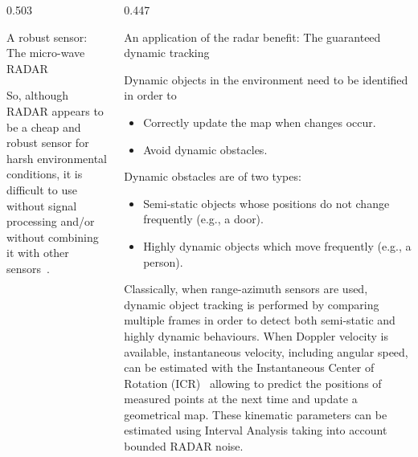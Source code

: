 \documentclass[final]{beamer}
\begin{document}
\begin{frame}[t]{}
\begin{columns}[T]
\begin{column}{0.503\linewidth}
\begin{block}{A robust sensor: The micro-wave RADAR}
    \vspace{2cm}

    So, although RADAR appears to be a cheap and robust sensor for harsh environmental conditions, it is difficult to use without signal processing and/or without combining it with other sensors~\cite{radarsurvey}.

    \end{block}

  \end{column}


  \begin{column}{0.447\linewidth}

	\begin{block}{An application of the radar benefit: The guaranteed dynamic tracking}
      {
        Dynamic objects in the environment need to be identified in order to 

        \vspace{0.5cm}

        \begin{itemize}
          \setlength{\itemsep}{15pt}
          \item Correctly update the map when changes occur.
          \item Avoid dynamic obstacles.
        \end{itemize} 

        \vspace{0.5cm}
        
        Dynamic obstacles are of two types:

        \vspace{0.5cm}

        \begin{itemize}
          \setlength{\itemsep}{15pt}
          \item Semi-static objects whose positions do not change frequently (e.g., a door).
          \item Highly dynamic objects which move frequently (e.g., a person).
        \end{itemize}

        \vspace{0.5cm}

        Classically, when range-azimuth sensors are used, dynamic object tracking is performed by comparing multiple frames in order to detect both semi-static and highly dynamic behaviours. When Doppler velocity is available, instantaneous velocity, including angular speed, can be estimated with the Instantaneous Center of Rotation (ICR)~\cite{radartracking} allowing to predict the positions of measured points at the next time and update a geometrical map. These kinematic parameters can be estimated using Interval Analysis taking into account bounded RADAR noise.
      }
    \end{block}


\end{column}
\end{columns}
\end{frame}
\end{document}
